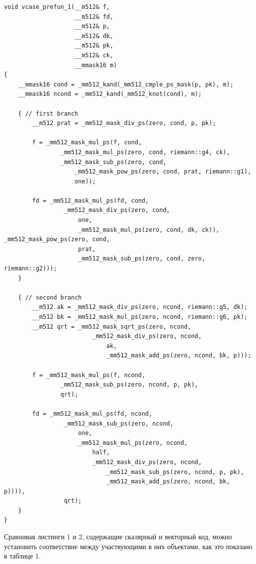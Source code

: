 \begin{lstlisting}[caption={caption},label={label}]
void vcase_prefun_1(__m512& f,
                    __m512& fd,
                    __m512& p,
                    __m512& dk,
                    __m512& pk,
                    __m512& ck,
                    __mmask16 m)
{
    __mmask16 cond = _mm512_kand(_mm512_cmple_ps_mask(p, pk), m);
    __mmask16 ncond = _mm512_kand(_mm512_knot(cond), m);

    { // first branch
        __m512 prat = _mm512_mask_div_ps(zero, cond, p, pk);

        f = _mm512_mask_mul_ps(f, cond,
                _mm512_mask_mul_ps(zero, cond, riemann::g4, ck),
                _mm512_mask_sub_ps(zero, cond,
                    _mm512_mask_pow_ps(zero, cond, prat, riemann::g1),
                    one));

        fd = _mm512_mask_mul_ps(fd, cond,
                 _mm512_mask_div_ps(zero, cond,
                     one,
                     _mm512_mask_mul_ps(zero, cond, dk, ck)),
_mm512_mask_pow_ps(zero, cond,
                     prat,
                     _mm512_mask_sub_ps(zero, cond, zero, riemann::g2)));
    }

    { // second branch
        __m512 ak = _mm512_mask_div_ps(zero, ncond, riemann::g5, dk);
        __m512 bk = _mm512_mask_mul_ps(zero, ncond, riemann::g6, pk);
        __m512 qrt = _mm512_mask_sqrt_ps(zero, ncond,
                         _mm512_mask_div_ps(zero, ncond,
                             ak,
                             _mm512_mask_add_ps(zero, ncond, bk, p)));

        f = _mm512_mask_mul_ps(f, ncond,
                _mm512_mask_sub_ps(zero, ncond, p, pk),
                qrt);

        fd = _mm512_mask_mul_ps(fd, ncond,
                 _mm512_mask_sub_ps(zero, ncond,
                     one,
                     _mm512_mask_mul_ps(zero, ncond,
                         half,
                         _mm512_mask_div_ps(zero, ncond,
                             _mm512_mask_sub_ps(zero, ncond, p, pk),
                             _mm512_mask_add_ps(zero, ncond, bk, p)))),
                 qrt);
    }
}                 
\end{lstlisting}

Сравнивая листинги 1 и 2, содержащие скалярный и векторный код, можно установить соответствие между участвующими в них объектами, как это показано в таблице 1.

